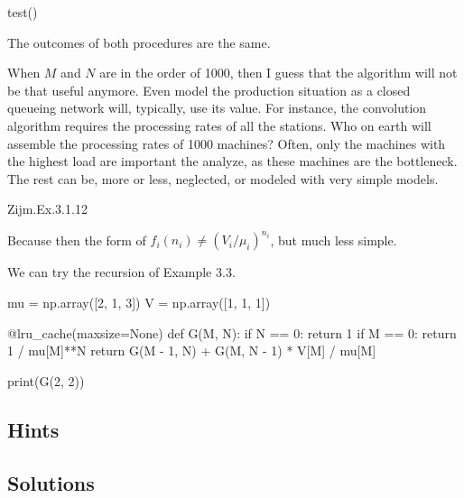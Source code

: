 \begin{exercise}
\begin{solution}
\begin{pyconsole}
test()
  
\end{pyconsole}

The  outcomes of both procedures are the same. 

When $M$ and $N$ are in the order of 1000, then I guess that the
algorithm will not be that useful anymore. Even model the production
situation as a closed queueing network will, typically, use its
value. For instance, the convolution algorithm requires the processing
rates of all the stations. Who on earth will assemble the processing
rates of 1000 machines? Often, only the machines with the highest load
are important the analyze, as these machines are the bottleneck. The
rest can be, more or less, neglected, or modeled with very simple
models.

\end{solution}
\end{exercise}

\begin{exercise}
Zijm.Ex.3.1.12
\begin{solution}
  Because then the form of $f_i(n_i)\neq (V_i/\mu_i)^{n_i}$, but much
  less simple.

We can try the recursion of Example 3.3.

\begin{pyconsole}
mu = np.array([2, 1, 3])
V = np.array([1, 1, 1])


@lru_cache(maxsize=None)
def G(M, N):
    if N == 0:
        return 1
    if M == 0:
        return 1 / mu[M]**N
    return G(M - 1, N) + G(M, N - 1) * V[M] / mu[M]

print(G(2, 2))
  
\end{pyconsole}
\end{solution}
\end{exercise}





\subsection*{Hints}

\subsection*{Solutions}

\clearpage
